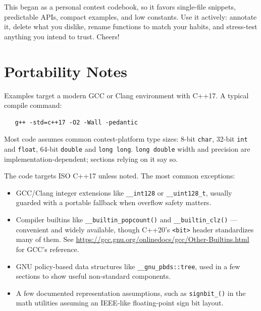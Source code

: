 \documentclass[10pt,letterpaper,twoside]{book}
\begin{document}
This began as a personal contest codebook, so it favors single-file snippets, predictable APIs,
compact examples, and low constants. Use it actively: annotate it, delete what you dislike, rename
functions to match your habits, and stress-test anything you intend to trust. Cheers!

\section*{Portability Notes}

Examples target a modern GCC or Clang environment with C++17. A typical compile command:

\begin{verbatim}
   g++ -std=c++17 -O2 -Wall -pedantic
\end{verbatim}

Most code assumes common contest-platform type sizes: 8-bit \texttt{char}, 32-bit \texttt{int} and
\texttt{float}, 64-bit \texttt{double} and \texttt{long long}. \texttt{long double} width and
precision are implementation-dependent; sections relying on it say so.

The code targets ISO C++17 unless noted. The most common exceptions:

\begin{itemize}
	\item GCC/Clang integer extensions like \texttt{\_\_int128} or \texttt{\_\_uint128\_t}, usually
	guarded with a portable fallback when overflow safety matters.
	\item Compiler builtins like \texttt{\_\_builtin\_popcount()} and \texttt{\_\_builtin\_clz()} ---
	convenient and widely available, though C++20's \texttt{\textless{}bit\textgreater{}} header
	standardizes many of them. See \url{https://gcc.gnu.org/onlinedocs/gcc/Other-Builtins.html} for
	GCC's reference.
	\item GNU policy-based data structures like \texttt{\_\_gnu\_pbds::tree}, used in a few sections
	to show useful non-standard components.
	\item A few documented representation assumptions, such as \texttt{signbit\_()} in the math
	utilities assuming an IEEE-like floating-point sign bit layout.
\end{itemize}

\tableofcontents

\mainmatter









\backmatter

\printindex
\end{document}
